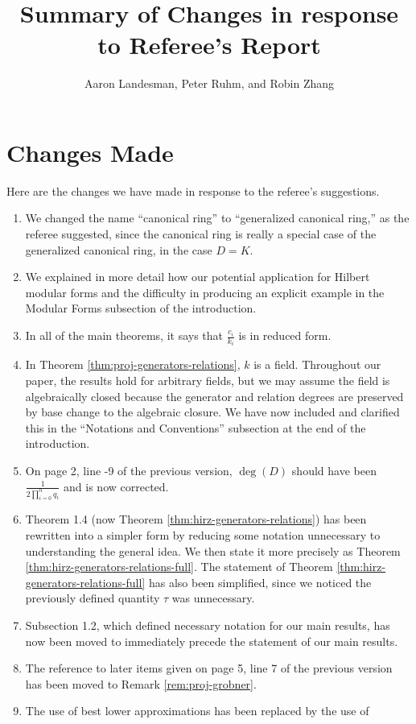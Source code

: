 \documentclass[10 pt]{amsart}
\title{Summary of Changes in response to Referee's Report}
\author{Aaron Landesman, Peter Ruhm, and Robin Zhang}
\theoremstyle{plain}
\theoremstyle{definition}
\theoremstyle{remark}
\numberwithin{equation}{section}
\begin{document}
\maketitle
\section{Changes Made}
Here are the changes we have made in response to the referee's suggestions.
\begin{enumerate}
	\item We changed the name ``canonical ring'' to ``generalized canonical ring,'' as the referee suggested,
		since the canonical ring is really a special case of the generalized canonical ring, in the case
		$D = K$.
	\item We explained
		in more detail how our potential application
		for Hilbert modular forms and the difficulty in producing
		an explicit example in the Modular Forms subsection of the introduction.
	\item In all of the main theorems, it says that $\frac{c_i}{k_i}$ is in reduced form. 
	\item In Theorem \autoref{thm:proj-generators-relations}, $k$ is a field. Throughout our paper, the results hold for arbitrary fields, but we may assume the field is algebraically closed because the generator and relation degrees are preserved by base change to the algebraic closure. We have now included and clarified this in the ``Notations and Conventions'' subsection at the end of the introduction.
	\item On page 2, line -9 of the previous version, $\deg(D)$ should have been $\frac{1}{2 \prod_{i=0}^n q_i}$ and is now corrected.
	\item Theorem 1.4 (now Theorem \ref{thm:hirz-generators-relations}) has been rewritten into a simpler form by reducing some
		notation unnecessary to understanding the general idea. We then state it more precisely as Theorem \ref{thm:hirz-generators-relations-full}. The statement of Theorem \ref{thm:hirz-generators-relations-full} has also been simplified, since we noticed the previously defined quantity $\tau$ was unnecessary.
	\item Subsection 1.2, which defined necessary notation for our main results, has now been moved to immediately precede the statement of our main results.
	\item The reference to later items given on page 5, line 7 of the previous version
		has been moved to Remark \ref{rem:proj-grobner}.
\item The use of best lower approximations has been replaced by the use of

\end{enumerate}
\end{document}

